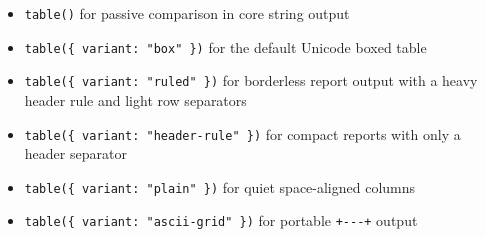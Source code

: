 \begin{itemize}
  \begin{itemize}
  \tightlist
  \item
    \texttt{t\allowbreak{}a\allowbreak{}b\allowbreak{}l\allowbreak{}e\allowbreak{}(\allowbreak{})} for passive comparison in core string output
  \item
    \texttt{t\allowbreak{}a\allowbreak{}b\allowbreak{}l\allowbreak{}e\allowbreak{}(\allowbreak{}\{\allowbreak{} \allowbreak{}v\allowbreak{}a\allowbreak{}r\allowbreak{}i\allowbreak{}a\allowbreak{}n\allowbreak{}t\allowbreak{}:\allowbreak{} \allowbreak{}"\allowbreak{}b\allowbreak{}o\allowbreak{}x\allowbreak{}"\allowbreak{} \allowbreak{}\}\allowbreak{})} for the default Unicode boxed table
  \item
    \texttt{t\allowbreak{}a\allowbreak{}b\allowbreak{}l\allowbreak{}e\allowbreak{}(\allowbreak{}\{\allowbreak{} \allowbreak{}v\allowbreak{}a\allowbreak{}r\allowbreak{}i\allowbreak{}a\allowbreak{}n\allowbreak{}t\allowbreak{}:\allowbreak{} \allowbreak{}"\allowbreak{}r\allowbreak{}u\allowbreak{}l\allowbreak{}e\allowbreak{}d\allowbreak{}"\allowbreak{} \allowbreak{}\}\allowbreak{})} for borderless report output with a heavy header rule and light row separators
  \item
    \texttt{t\allowbreak{}a\allowbreak{}b\allowbreak{}l\allowbreak{}e\allowbreak{}(\allowbreak{}\{\allowbreak{} \allowbreak{}v\allowbreak{}a\allowbreak{}r\allowbreak{}i\allowbreak{}a\allowbreak{}n\allowbreak{}t\allowbreak{}:\allowbreak{} \allowbreak{}"\allowbreak{}h\allowbreak{}e\allowbreak{}a\allowbreak{}d\allowbreak{}e\allowbreak{}r\allowbreak{}-\allowbreak{}r\allowbreak{}u\allowbreak{}l\allowbreak{}e\allowbreak{}"\allowbreak{} \allowbreak{}\}\allowbreak{})} for compact reports with only a header separator
  \item
    \texttt{t\allowbreak{}a\allowbreak{}b\allowbreak{}l\allowbreak{}e\allowbreak{}(\allowbreak{}\{\allowbreak{} \allowbreak{}v\allowbreak{}a\allowbreak{}r\allowbreak{}i\allowbreak{}a\allowbreak{}n\allowbreak{}t\allowbreak{}:\allowbreak{} \allowbreak{}"\allowbreak{}p\allowbreak{}l\allowbreak{}a\allowbreak{}i\allowbreak{}n\allowbreak{}"\allowbreak{} \allowbreak{}\}\allowbreak{})} for quiet space-aligned columns
  \item
    \texttt{t\allowbreak{}a\allowbreak{}b\allowbreak{}l\allowbreak{}e\allowbreak{}(\allowbreak{}\{\allowbreak{} \allowbreak{}v\allowbreak{}a\allowbreak{}r\allowbreak{}i\allowbreak{}a\allowbreak{}n\allowbreak{}t\allowbreak{}:\allowbreak{} \allowbreak{}"\allowbreak{}a\allowbreak{}s\allowbreak{}c\allowbreak{}i\allowbreak{}i\allowbreak{}-\allowbreak{}g\allowbreak{}r\allowbreak{}i\allowbreak{}d\allowbreak{}"\allowbreak{} \allowbreak{}\}\allowbreak{})} for portable \texttt{+\allowbreak{}-\allowbreak{}-\allowbreak{}-\allowbreak{}+} output

\end{itemize}
\end{itemize}
